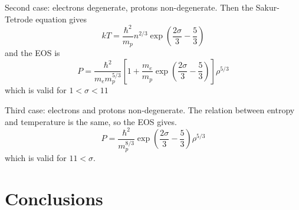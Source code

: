 \documentclass{emulateapj}
\begin{document}
Second case: electrons degenerate, protons non-degenerate.  Then the
Sakur-Tetrode equation gives
\begin{equation}
  kT = \frac{\hbar^2}{m_p} n^{2/3} 
\exp\left(\frac{2\sigma}{3} - \frac{5}{3}\right)
\end{equation}
and the EOS is
\begin{equation}
  P = \frac{\hbar^2}{m_e m_p^{5/3}}
\left[1 + \frac{m_e}{m_p} 
\exp\left(\frac{2\sigma}{3} - \frac{5}{3}\right) \right]
\rho^{5/3}
\end{equation}
which is valid for $1 < \sigma < 11$

Third case: electrons and protons non-degenerate.  The relation
between entropy and temperature is the same, so the EOS gives.
\begin{equation}
  P = \frac{\hbar^2}{m_p^{8/3}} 
\exp\left(\frac{2\sigma}{3} - \frac{5}{3}\right) 
\rho^{5/3}
\end{equation}
which is valid for $11 < \sigma$.

\section{Conclusions}
\label{sec:conc}

\acknowledgements




\clearpage
\end{document}
